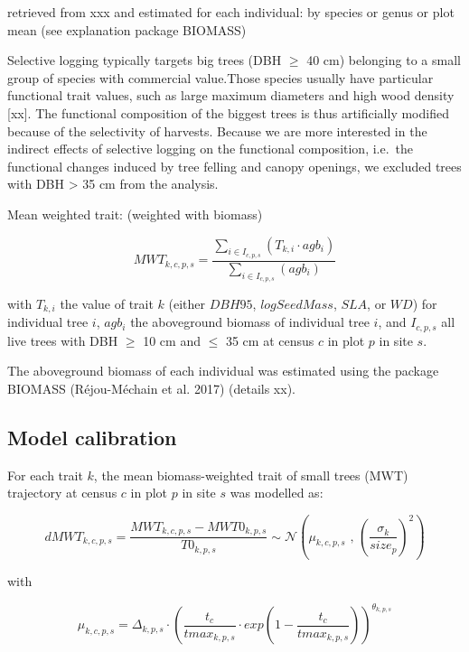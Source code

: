 \documentclass[]{elsarticle} %
\begin{document}
retrieved from xxx and estimated for each individual: by species or
genus or plot mean (see explanation package BIOMASS)

Selective logging typically targets big trees (DBH \(\geq\) 40 cm)
belonging to a small group of species with commercial value.Those
species usually have particular functional trait values, such as large
maximum diameters and high wood density {[}xx{]}. The functional
composition of the biggest trees is thus artificially modified because
of the selectivity of harvests. Because we are more interested in the
indirect effects of selective logging on the functional composition,
i.e.~the functional changes induced by tree felling and canopy openings,
we excluded trees with DBH \textgreater{} 35 cm from the analysis.

Mean weighted trait: (weighted with biomass)

\begin{equation}  
MWT_{k,c,p,s} = \frac{\sum_{i \in I_{c,p,s}}(T_{k,i}\cdot agb_i)}{\sum_{i \in I_{c,p,s}}(agb_i)}
\end{equation}

with \(T_{k,i}\) the value of trait \(k\) (either \(DBH95\),
\(logSeedMass\), \(SLA\), or \(WD\)) for individual tree \(i\),
\(agb_i\) the aboveground biomass of individual tree \(i\), and
\(I_{c,p,s}\) all live trees with DBH \(\geq\) 10 cm and \(\leq\) 35 cm
at census \(c\) in plot \(p\) in site \(s\).

The aboveground biomass of each individual was estimated using the
package BIOMASS (Réjou-Méchain et al. 2017) (details xx).

\subsection{Model calibration}\label{model-calibration}

For each trait \(k\), the mean biomass-weighted trait of small trees
(MWT) trajectory at census \(c\) in plot \(p\) in site \(s\) was
modelled as:

\begin{equation}  
dMWT_{k,c,p,s} = \frac{MWT_{k,c,p,s} - MWT0_{k,p,s}}{T0_{k,p,s}} \sim \mathcal{N}\left( \mu_{k,c,p,s}\text{ , } \left(\frac{\sigma_k}{size_p}\right)^2\right)
\end{equation}

with

\begin{equation}  
\mu_{k,c,p,s} = \Delta_{k,p,s} \cdot \left( \frac{t_c}{tmax_{k,p,s}} \cdot exp\left(1-\frac{t_c}{tmax_{k,p,s}}\right) \right)^{\theta_{k,p,s}}
\end{equation}
\end{document}
